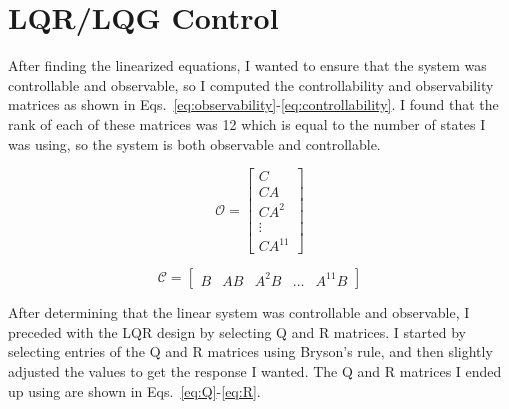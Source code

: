 \documentclass{article}
\begin{document}
\section{LQR/LQG Control}
After finding the linearized equations, I wanted to ensure that the system was controllable and observable, so I computed the controllability and observability matrices as shown in Eqs.~\ref{eq:observability}-\ref{eq:controllability}. I found that the rank of each of these matrices was 12 which is equal to the number of states I was using, so the system is both observable and controllable.

\begin{equation}\label{eq:observability}
\mathscr{O}=
\begin{bmatrix}
C \\
CA \\
CA^2 \\
\vdots \\
CA^{11}
\end{bmatrix}
\end{equation}

\begin{equation}\label{eq:controllability}
\mathscr{C}=
\begin{bmatrix}
B & AB & A^2B & \dots & A^{11}B
\end{bmatrix}
\end{equation}

After determining that the linear system was controllable and observable, I preceded with the LQR design by selecting Q and R matrices. I started by selecting entries of the Q and R matrices using Bryson's rule, and then slightly adjusted the values to get the response I wanted. The Q and R matrices I ended up using are shown in Eqs.~\ref{eq:Q}-\ref{eq:R}.
\end{document}
